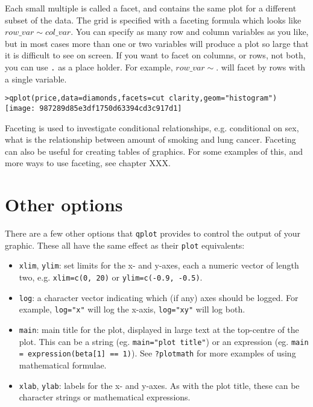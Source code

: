 Each small multiple is called a facet, and contains the same plot for a different subset of the data.  The grid is specified with a faceting formula which looks like $row\_var \sim col\_var $.  You can specify as many row and column variables as you like, but in most cases more than one or two variables will produce a plot so large that it is difficult to see on screen.  If you want to facet on columns, or rows, not both, you can use {\tt .} as a place holder.  For example, $row\_var \sim .$ will facet by rows with a single variable.  

\begin{alltt}
> qplot(price, data = diamonds, facets = cut ~ clarity, geom = "histogram")
\texttt{[image: 987289d85e3df1750d63394cd3c917d1]}

\end{alltt}

Faceting is used to investigate conditional relationships, e.g. conditional on sex, what is the relationship between amount of smoking and lung cancer.  Faceting can also be useful for creating tables of graphics.  For some examples of this, and more ways to use faceting, see chapter XXX.

\section{Other options}\label{sec:other_options}

There are a few other options that {\tt qplot} provides to control the output of your graphic.  These all have the same effect as their {\tt plot} equivalents:

\begin{itemize}
	\item {\tt xlim}, {\tt ylim}: set limits for the x- and y-axes, each a numeric vector of length two, e.g. {\tt xlim=c(0, 20)} or {\tt ylim=c(-0.9, -0.5)}.
	\item {\tt log}: a character vector indicating which (if any) axes should be logged.  For example, {\tt log="x"} will log the x-axis, {\tt log="xy"} will log both.
	\item {\tt main}: main title for the plot, displayed in large text at the top-centre of the plot.  This can be a string (eg. {\tt main="plot title"}) or an expression (eg. {\tt main = expression(beta[1] == 1)}).  See {\tt ?plotmath} for more examples of using mathematical formulae.
	\item {\tt xlab}, {\tt ylab}: labels for the x- and y-axes.  As with the plot title, these can be character strings or mathematical expressions.
\end{itemize}

